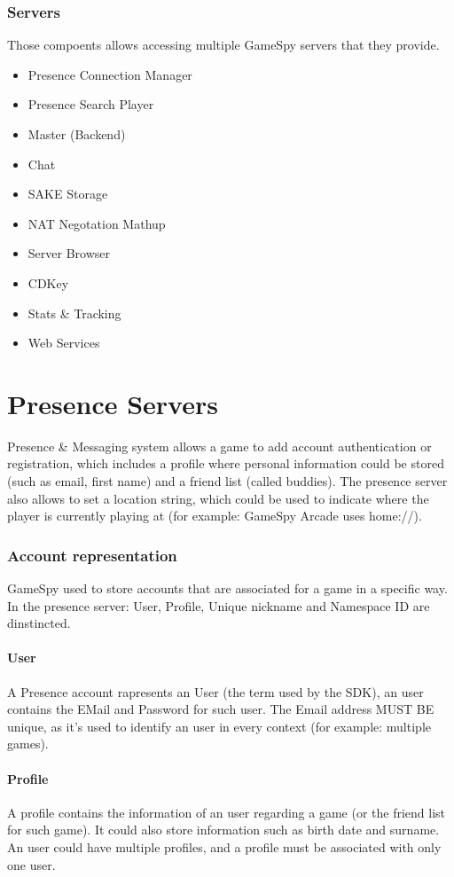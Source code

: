 \documentclass[oneside,titlepage,a4paper]{Definition/retrospy} %
\begin{document}
		\subsection{Servers}
		\par Those compoents allows accessing multiple GameSpy servers that they provide.
		\begin{itemize}
			\item Presence Connection Manager
			\item Presence Search Player
			\item Master (Backend)
			\item Chat
			\item SAKE Storage
			\item NAT Negotation Mathup
			\item Server Browser
			\item CDKey
			\item Stats \& Tracking
			\item Web Services
		\end{itemize}
	\chapter{Presence Servers}
		            Presence \& Messaging system allows a game to add account authentication or registration, which includes a profile where personal information could be stored (such as email, first name) and a friend list (called buddies).
            The presence server also allows to set a location string, which could be used to indicate where the player is currently playing at (for example: GameSpy Arcade uses home://).

		\subsection{Account representation}
		GameSpy used to store accounts that are associated for a game in a specific way. In the presence server: User, Profile, Unique nickname and Namespace ID are dinstincted.
		\subsubsection{User}
	            A Presence account rapresents an User (the term used by the SDK), an user contains the EMail and Password for such user.
	            The Email address MUST BE unique, as it's used to identify an user in every context (for example: multiple games).
		\subsubsection{Profile}
	            A profile contains the information of an user regarding a game (or the friend list for such game). It could also store information such as birth date and surname.
	            An user could have multiple profiles, and a profile must be associated with only one user.
\end{document}
